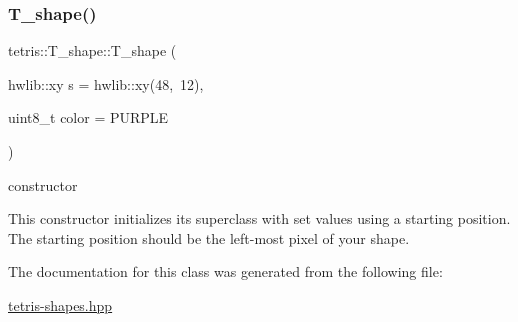 \subsubsection{\texorpdfstring{T\+\_\+shape()}{T\_shape()}}
{\footnotesize\ttfamily tetris\+::\+T\+\_\+shape\+::\+T\+\_\+shape (\begin{DoxyParamCaption}\item[{hwlib\+::xy}]{s = {\ttfamily hwlib\+:\+:xy(48,~12)},  }\item[{uint8\+\_\+t}]{color = {\ttfamily PURPLE} }\end{DoxyParamCaption})\hspace{0.3cm}{\ttfamily [inline]}}



constructor 

This constructor initializes its superclass with set values using a starting position. The starting position should be the left-\/most pixel of your shape. 

The documentation for this class was generated from the following file\+:\begin{DoxyCompactItemize}
\item 
\hyperlink{tetris-shapes_8hpp}{tetris-\/shapes.\+hpp}\end{DoxyCompactItemize}
